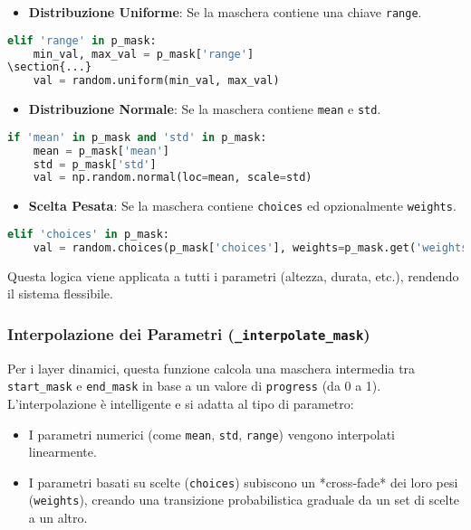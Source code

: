 \begin{itemize}
 \item \textbf{Distribuzione Uniforme}: Se la maschera contiene una chiave \texttt{range}.
\end{itemize}

\begin{lstlisting}[language=Python]
elif 'range' in p_mask:
    min_val, max_val = p_mask['range']
\section{...}
    val = random.uniform(min_val, max_val)
\end{lstlisting}
\begin{itemize}
 \item \textbf{Distribuzione Normale}: Se la maschera contiene \texttt{mean} e \texttt{std}.
\end{itemize}

\begin{lstlisting}[language=Python]
if 'mean' in p_mask and 'std' in p_mask:
    mean = p_mask['mean']
    std = p_mask['std']
    val = np.random.normal(loc=mean, scale=std)
\end{lstlisting}
\begin{itemize}
 \item \textbf{Scelta Pesata}: Se la maschera contiene \texttt{choices} ed opzionalmente \texttt{weights}.
\end{itemize}

\begin{lstlisting}[language=Python]
elif 'choices' in p_mask:
    val = random.choices(p_mask['choices'], weights=p_mask.get('weights'), k=1)[0]
\end{lstlisting}

Questa logica viene applicata a tutti i parametri (altezza, durata, etc.), rendendo il sistema flessibile.
\subsubsection{Interpolazione dei Parametri (\texttt{\_interpolate\_mask})}
Per i layer dinamici, questa funzione calcola una maschera intermedia tra \texttt{start\_mask} e \texttt{end\_mask} in base a un valore di \texttt{progress} (da 0 a 1). L'interpolazione è intelligente e si adatta al tipo di parametro:
\begin{itemize}
 \item I parametri numerici (come \texttt{mean}, \texttt{std}, \texttt{range}) vengono interpolati linearmente.
 \item I parametri basati su scelte (\texttt{choices}) subiscono un *cross-fade* dei loro pesi (\texttt{weights}), creando una transizione probabilistica graduale da un set di scelte a un altro.
\end{itemize}

